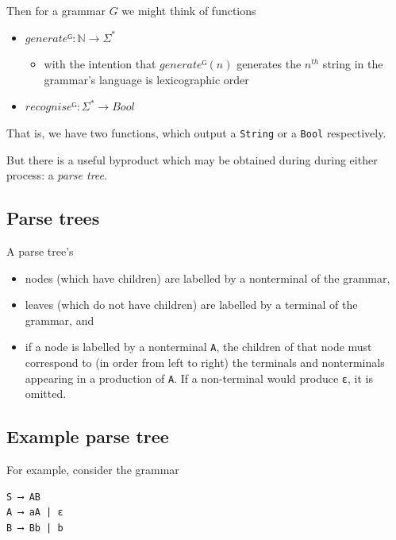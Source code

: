 \documentclass[11pt]{article}
\theoremstyle{definition}
\begin{document}
Then for a grammar \(G\) we might think of functions
\begin{itemize}
\item \(generateᴳ : ℕ → Σ^{*}\)
\begin{itemize}
\item with the intention that \(generateᴳ(n)\) generates the \(n^{th}\)
string in the grammar's language is lexicographic order
\end{itemize}
\item \(recogniseᴳ : Σ^{*} → Bool\)
\end{itemize}
That is, we have two functions, which output a \texttt{String} or
a \texttt{Bool} respectively.

But there is a useful byproduct which may be obtained during
during either process: a \emph{parse tree}.

\subsection{Parse trees}
\label{sec:orgdcdb267}

A parse tree's
\begin{itemize}
\item nodes (which have children) are
labelled by a nonterminal of the grammar,
\item leaves (which do not have children) are
labelled by a terminal of the grammar, and
\item if a node is labelled by a nonterminal \texttt{A},
the children of that node must correspond to
(in order from left to right)
the terminals and nonterminals appearing in a production of \texttt{A}.
If a non-terminal would produce \texttt{ε}, it is omitted.
\end{itemize}

\subsection{Example parse tree}
\label{sec:orgf64e8e6}

For example, consider the grammar
\begin{verbatim}
S ⟶ AB
A ⟶ aA | ε
B ⟶ Bb | b
\end{verbatim}
\end{document}
